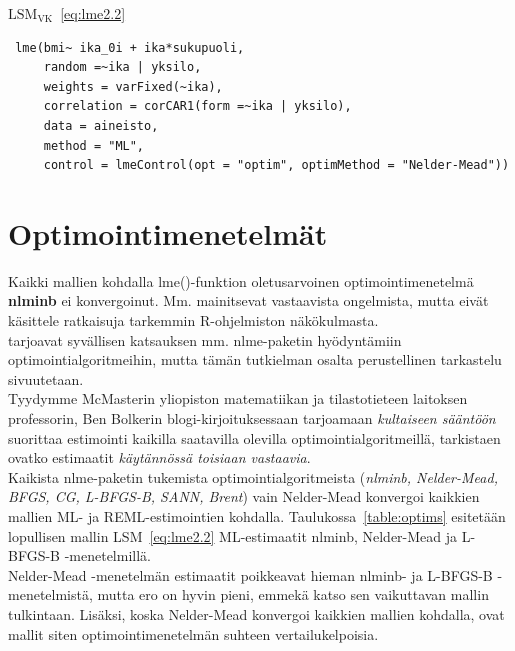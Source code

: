\documentclass[finnish]{docopts}
\begin{document}
$\text{LSM}_{\text{VK}}$~\ref{eq:lme2.2}\\

\begin{lstlisting}
 lme(bmi~ ika_0i + ika*sukupuoli,
     random =~ika | yksilo,
     weights = varFixed(~ika),
     correlation = corCAR1(form =~ika | yksilo),
     data = aineisto,
     method = "ML",
     control = lmeControl(opt = "optim", optimMethod = "Nelder-Mead"))
\end{lstlisting}

\section{Optimointimenetelmät}
\label{sec:opt}

Kaikki mallien kohdalla lme()-funktion oletusarvoinen optimointimenetelmä \textbf{nlminb} ei konvergoinut. Mm. \cite{west14} mainitsevat vastaavista ongelmista, mutta eivät käsittele ratkaisuja tarkemmin R-ohjelmiston näkökulmasta.\\

\cite{nocedal06} tarjoavat syvällisen katsauksen mm. nlme-paketin hyödyntämiin optimointialgoritmeihin, mutta tämän tutkielman osalta perustellinen tarkastelu sivuutetaan.\\

Tyydymme McMasterin yliopiston matematiikan ja tilastotieteen laitoksen professorin, Ben Bolkerin \citeyearpar{bolker2020} blogi-kirjoituksessaan tarjoamaan \textit{kultaiseen sääntöön} suorittaa estimointi kaikilla saatavilla olevilla optimointialgoritmeillä, tarkistaen ovatko estimaatit \textit{käytännössä toisiaan vastaavia}.\\

Kaikista nlme-paketin tukemista optimointialgoritmeista (\textit{nlminb, Nelder-Mead, BFGS, CG, L-BFGS-B, SANN, Brent}) vain Nelder-Mead konvergoi kaikkien mallien ML- ja REML-estimointien kohdalla. Taulukossa~\ref{table:optims} esitetään lopullisen mallin LSM~\ref{eq:lme2.2} ML-estimaatit nlminb, Nelder-Mead ja L-BFGS-B -menetelmillä.\\

Nelder-Mead -menetelmän estimaatit poikkeavat hieman nlminb- ja L-BFGS-B -menetelmistä, mutta ero on hyvin pieni, emmekä katso sen vaikuttavan mallin tulkintaan. Lisäksi, koska Nelder-Mead konvergoi kaikkien mallien kohdalla, ovat mallit siten optimointimenetelmän suhteen vertailukelpoisia.\\
\end{document}
